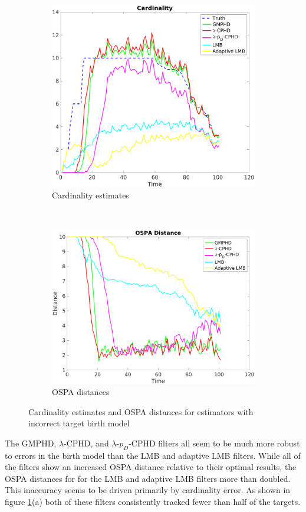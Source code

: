 \documentclass{article}
\begin{document}
\begin{figure}[H]
  \centering
  \begin{subfigure}[t]{0.49\textwidth}
    \centering
    \includegraphics[width=1\linewidth]{bad_birth/cardinality.png}
    \caption{Cardinality estimates}
  \end{subfigure}%
  ~ 
  \begin{subfigure}[t]{0.49\textwidth}
    \centering
    \includegraphics[width=1\linewidth]{bad_birth/ospa.png}
    \caption{OSPA distances}
  \end{subfigure}
  \caption{Cardinality estimates and OSPA distances for estimators with incorrect target birth model}
  \label{fig:bad_bm_performance}
\end{figure}
The GMPHD, $\lambda$-CPHD, and $\lambda$-$p_D$-CPHD filters all seem to be much more robust to errors in the birth model than the LMB and adaptive LMB filters. While all of the filters show an increased OSPA distance relative to their optimal results, the OSPA distances for for the LMB and adaptive LMB filters more than doubled. This inaccuracy seems to be driven primarily by cardinality error. As shown in figure \ref{fig:bad_bm_performance}(a) both of these filters consistently tracked fewer than half of the targets.
\end{document}
